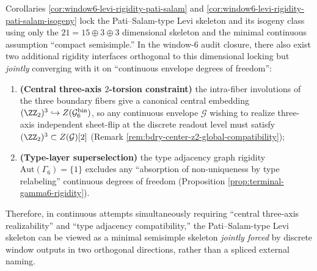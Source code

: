 \begin{remark}\label{rem:window6-levi-rigidity-center-autgamma6}
Corollaries \ref{cor:window6-levi-rigidity-pati-salam} and \ref{cor:window6-levi-rigidity-pati-salam-isogeny} lock the Pati--Salam-type Levi skeleton and its isogeny class using only the \(21=15\oplus 3\oplus 3\) dimensional skeleton and the minimal continuous assumption ``compact semisimple.''
In the window-\(6\) audit closure, there also exist two additional rigidity interfaces orthogonal to this dimensional locking but \emph{jointly} converging with it on ``continuous envelope degrees of freedom'':
\begin{enumerate}
  \item \textbf{(Central three-axis \(2\)-torsion constraint)} the intra-fiber involutions of the three boundary fibers give a canonical central embedding \((\ZZ_2)^3\hookrightarrow Z(\mathcal{G}^{\mathrm{bin}}_6)\), so any continuous envelope \(\mathcal{G}\) wishing to realize three-axis independent sheet-flip at the discrete readout level must satisfy \((\ZZ_2)^3\subset Z(\mathcal{G})[2]\) (Remark \ref{rem:bdry-center-z2-global-compatibility});
  \item \textbf{(Type-layer superselection)} the type adjacency graph rigidity \(\mathrm{Aut}(\Gamma_6)=\{1\}\) excludes any ``absorption of non-uniqueness by type relabeling'' continuous degrees of freedom (Proposition \ref{prop:terminal-gamma6-rigidity}).
\end{enumerate}
Therefore, in continuous attempts simultaneously requiring ``central three-axis realizability'' and ``type adjacency compatibility,'' the Pati--Salam-type Levi skeleton can be viewed as a minimal semisimple skeleton \emph{jointly forced} by discrete window outputs in two orthogonal directions, rather than a spliced external naming.
\end{remark}

